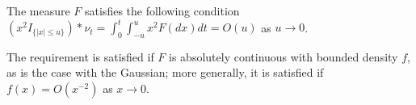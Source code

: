 \begin{ass} \label{as:nu}
  \mbox{}
  The \levy measure $F$ satisfies the following condition
  $(x^2I_{\{\vert x \vert \le u\}})\ast \nu_t = \int_0^t \int_{-u}^{u} x^2 F(dx) dt = O(u)$ as $u \to 0$.
\end{ass}
\begin{remark}

  The  requirement  is satisfied if $F$ is absolutely continuous with bounded density $f$, as is the case with the Gaussian; more generally, it is satisfied  if  $f(x) = O(x^{-2})$ as $x \to 0$.
\end{remark}
